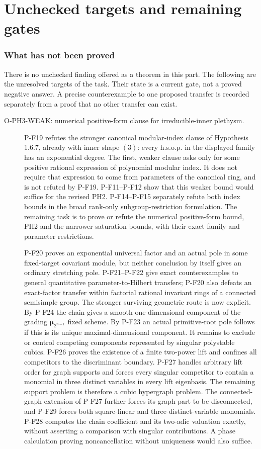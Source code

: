\part{Unchecked targets and remaining gates}
\label{part:open}
\section{What has not been proved}
There is no unchecked finding offered as a theorem in this part. The
following are the unresolved targets of the task. Their state is a
current gate, not a proved negative answer. A precise counterexample to
one proposed transfer is recorded separately from a proof that no other
transfer can exist.

\begin{description}
\item[O-PH3-WEAK: numerical positive-form clause for irreducible-inner plethysm.]
P-F19 refutes the stronger canonical modular-index clause of
Hypothesis 1.6.7, already with inner shape $(3)$: every h.s.o.p.
in the displayed family has an exponential degree. The first,
weaker clause asks only for some positive rational expression of
polynomial modular index. It does not require that expression to
come from parameters of the canonical ring, and is not refuted by
P-F19. P-F11--P-F12 show that this weaker bound would suffice for
the revised PH2. P-F14--P-F15 separately refute both index bounds
in the broad rank-only subgroup-restriction formulation. The
remaining task is to prove or refute the numerical positive-form
bound, PH2 and the narrower saturation bounds, with their exact
family and parameter restrictions.

P-F20 proves an exponential universal factor and an actual pole in
some fixed-target covariant module, but neither conclusion by itself
gives an ordinary stretching pole. P-F21--P-F22 give exact
counterexamples to general quantitative parameter-to-Hilbert
transfers; P-F20 also defeats an exact-factor transfer within
factorial rational invariant rings of a connected semisimple group.
The stronger surviving geometric route is now explicit. By P-F24
the chain gives a smooth one-dimensional component of the grading
$\boldsymbol\mu_{2^{n-1}}$ fixed scheme. By P-F23 an actual
primitive-root pole follows if this is its unique maximal-dimensional
component. It remains to exclude or control competing components
represented by singular polystable cubics. P-F26 proves the existence
of a finite two-power lift and confines all competitors to the
discriminant boundary. P-F27 handles arbitrary lift order for graph
supports and forces every singular competitor to contain a monomial
in three distinct variables in every lift eigenbasis. The remaining
support problem is therefore a cubic hypergraph problem. The
connected-graph extension of P-F27 further forces its graph part
to be disconnected, and P-F29 forces both square-linear and
three-distinct-variable monomials. P-F28 computes the chain
coefficient and its two-adic valuation exactly, without asserting
a comparison with singular contributions. A phase
calculation proving noncancellation without uniqueness would also suffice.


\end{description}
